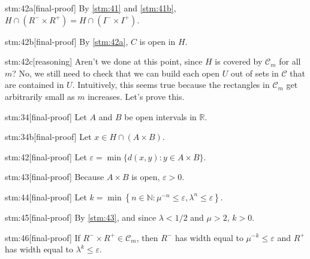 \begin{stm}{stm:42a}[final-proof]
By \ref{stm:41} and \ref{stm:41b}, $H \cap (R^- \times R^+) = H \cap (I^- \times I^+)$.
\end{stm}

\begin{stm}{stm:42b}[final-proof]
By \ref{stm:42a}, $C$ is open in $H$.
\end{stm}

\begin{stm}{stm:42c}[reasoning]
Aren’t we done at this point, since $H$ is covered by $\mathcal{C}_m$ for all $m$? No, we still need to check that we can build each open $U$ out of sets in $\mathcal{C}$ that are contained in $U$. Intuitively, this seems true because the rectangles in $\mathcal{C}_m$ get arbitrarily small as $m$ increases. Let's prove this.
\end{stm}

\begin{stm}{stm:34}[final-proof]
Let $A$ and $B$ be open intervals in $\mathbb{R}$.
\end{stm}

\begin{stm}{stm:34b}[final-proof]
Let $x \in H \cap (A \times B)$.
\end{stm}

\begin{stm}{stm:42}[final-proof]
Let $\varepsilon = \min\{ d(x, y) : y \in A \times B \}$. 
\end{stm}

\begin{stm}{stm:43}[final-proof]
Because $A \times B$ is open, $\varepsilon > 0$.
\end{stm}

\begin{stm}{stm:44}[final-proof]
Let $k = \min \left\{ n \in \mathbb{N} : \mu^{-n} \leq \varepsilon, \lambda^n \leq \varepsilon \right\}$.
\end{stm}

\begin{stm}{stm:45}[final-proof]
By \ref{stm:43}, and since $\lambda < 1/2$ and $\mu > 2$, $k > 0$.
\end{stm}

\begin{stm}{stm:46}[final-proof]
If $R^- \times R^+ \in \mathcal{C}_m$, then $R^-$ has width equal to $\mu^{-k} \leq \varepsilon$ and $R^+$ has width equal to $\lambda^k \leq \varepsilon$.
\end{stm}

